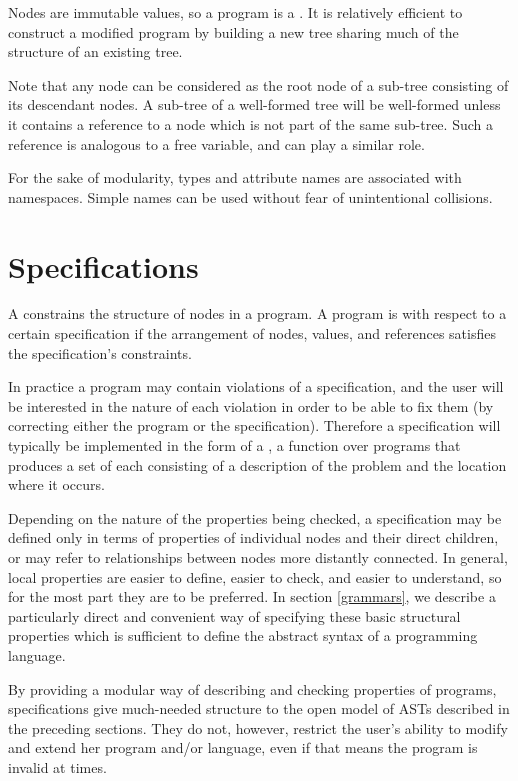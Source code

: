 Nodes are immutable values, so a program is a  \cite{sarnak}. It is relatively efficient to construct a modified program by building a new tree sharing much of the structure of an existing tree.

Note that any node can be considered as the root node of a sub-tree consisting of its descendant nodes. A sub-tree of a well-formed tree will be well-formed unless it contains a  reference to a node which is not part of the same sub-tree. Such a reference is analogous to a free variable, and can play a similar role.

For the sake of modularity, types and attribute names are associated with namespaces. Simple names can be used without fear of unintentional collisions. 


\section{Specifications}
A  constrains the structure of nodes in a program. A program is  with respect to a certain specification if the arrangement of nodes, values, and references satisfies the specification's constraints.

In practice a program may contain violations of a specification, and the user will be interested in the nature of each violation in order to be able to fix them (by correcting either the program or the specification). Therefore a specification will typically be implemented in the form of a , a function over programs that produces a set of  each consisting of a description of the problem and the location where it occurs.

Depending on the nature of the properties being checked, a specification may be defined only in terms of  properties of individual nodes and their direct children, or may refer to  relationships between nodes more distantly connected. In general, local properties are easier to define, easier to check, and easier to understand, so for the most part they are to be preferred. In section \ref{grammars}, we describe a particularly direct and convenient way of specifying these basic structural properties which is sufficient to define the abstract syntax of a programming language.

By providing a modular way of describing and checking properties of programs, specifications give much-needed structure to the open model of ASTs described in the preceding sections. They do not, however, restrict the user's ability to modify and extend her program and/or language, even if that means the program is invalid at times.


